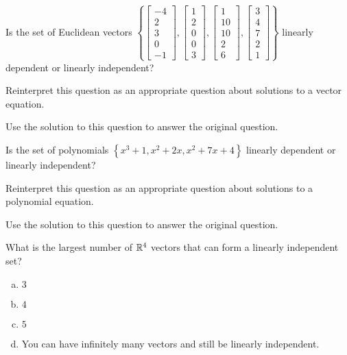 \begin{activity}{5}
  Is the set of Euclidean vectors \(\left\{
  \begin{bmatrix}-4\\2\\3\\0\\-1\end{bmatrix},
  \begin{bmatrix}1\\2\\0\\0\\3\end{bmatrix},
  \begin{bmatrix}1\\10\\10\\2\\6\end{bmatrix},
  \begin{bmatrix}3\\4\\7\\2\\1\end{bmatrix}
  \right\}\) linearly dependent or linearly independent?
\begin{subactivity}
Reinterpret this question as an appropriate question about solutions to a vector equation.
\end{subactivity}
\begin{subactivity} 
Use the solution to this question to answer the original question.
\end{subactivity}
\end{activity}

\begin{activity}{10}
  Is the set of polynomials \(\left\{
  x^3+1,x^2+2x,x^2+7x+4
  \right\}\) linearly dependent or linearly independent?
\begin{subactivity}
Reinterpret this question as an appropriate question about solutions to a polynomial equation.
\end{subactivity}
\begin{subactivity} 
Use the solution to this question to answer the original question.
\end{subactivity}
\end{activity}

\begin{activity}{5}
What is the largest number of \(\mathbb{R}^4\) vectors that can form a linearly independent set?
\begin{enumerate}[(a)]
\item \(3\)
\item \(4\)
\item \(5\)
\item You can have infinitely many vectors and still be linearly independent.
\end{enumerate}
\end{activity}

